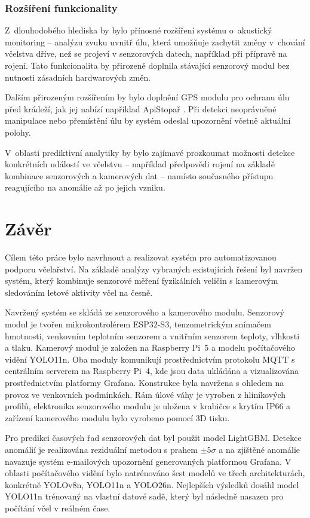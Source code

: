 \subsection*{Rozšíření funkcionality}
Z~dlouhodobého hlediska by bylo přínosné rozšíření systému o~akustický monitoring -- analýzu zvuku uvnitř úlu, která umožňuje zachytit změny v~chování včelstva dříve, než se projeví v senzorových datech, například při přípravě na rojení. Tato funkcionalita by přirozeně doplnila stávající senzorový modul bez nutnosti zásadních hardwarových změn.

Dalším přirozeným rozšířením by bylo doplnění GPS modulu pro ochranu úlu před krádeží, jak jej nabízí například ApiStopař \cite{apivcelar}. Při detekci neoprávněné manipulace nebo přemístění úlu by systém odeslal upozornění včetně aktuální polohy.

V~oblasti prediktivní analytiky by bylo zajímavé prozkoumat možnosti detekce konkrétních událostí ve včelstvu -- například předpovědi rojení na základě kombinace senzorových a kamerových dat -- namísto současného přístupu reagujícího na anomálie až po jejich vzniku.

\chapter{Závěr}
Cílem této práce bylo navrhnout a realizovat systém pro automatizovanou podporu včelařství. Na základě analýzy vybraných existujících řešení byl navržen systém, který kombinuje senzorové měření fyzikálních veličin s kamerovým sledováním letové aktivity včel na česně.

Navržený systém se skládá ze senzorového a kamerového modulu. Senzorový modul je tvořen mikrokontrolérem ESP32-S3, tenzometrickým snímačem hmotnosti, venkovním teplotním senzorem a vnitřním senzorem teploty, vlhkosti a tlaku. Kamerový modul je založen na Raspberry Pi~5 a modelu počítačového vidění YOLO11n. Oba moduly komunikují prostřednictvím protokolu MQTT s centrálním serverem na Raspberry Pi~4, kde jsou data ukládána a vizualizována prostřednictvím platformy Grafana. Konstrukce byla navržena s ohledem na provoz ve venkovních podmínkách. Rám úlové váhy je vyroben z hliníkových profilů, elektronika senzorového modulu je uložena v krabičce s krytím IP66 a zařízení kamerového modulu bylo vyrobeno pomocí 3D tisku.

Pro predikci časových řad senzorových dat byl použit model LightGBM. Detekce anomálií je realizována reziduální metodou s prahem $\pm5\sigma$ a na zjištěné anomálie navazuje systém e-mailových upozornění generovaných platformou Grafana. V oblasti počítačového vidění bylo natrénováno šest modelů ve třech architekturách, konkrétně YOLOv8n, YOLO11n a YOLO26n. Nejlepších výsledků dosáhl model YOLO11n trénovaný na vlastní datové sadě, který byl následně nasazen pro počítání včel v reálném čase.

